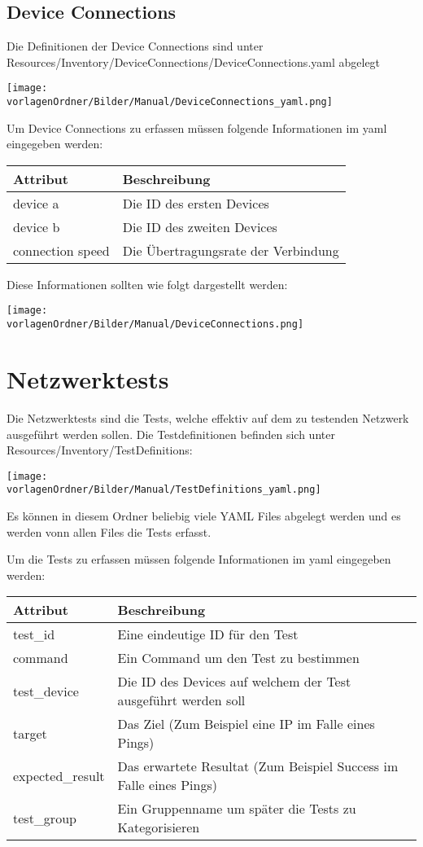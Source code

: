 \documentclass[
	ngerman,
	toc=listof, %
	toc=bibliography, %
	footnotes=multiple, %
	parskip=half, %
	numbers=noendperiod %
]{scrartcl}
\newcommand{\vorlagenOrdner}{../99_Vorlagen} %
\begin{document}
	\subsection{Device Connections}
		Die Definitionen der Device Connections sind unter \\
		Resources/Inventory/DeviceConnections/DeviceConnections.yaml abgelegt

		\texttt{[image: \\vorlagenOrdner/Bilder/Manual/DeviceConnections\_yaml.png]}

		Um Device Connections zu erfassen müssen folgende Informationen im yaml eingegeben werden:

		\begin{tabularx}{\textwidth}{ll}
			\toprule
			Attribut & Beschreibung \\
			\midrule
			device a & Die ID des ersten Devices \\
			device b & Die ID des zweiten Devices \\
			connection speed & Die Übertragungsrate der Verbindung\\
			\midrule
		\end{tabularx}

		Diese Informationen sollten wie folgt dargestellt werden: 

		\texttt{[image: \\vorlagenOrdner/Bilder/Manual/DeviceConnections.png]}

\section{Netzwerktests}
	Die Netzwerktests sind die Tests, welche effektiv auf dem zu testenden Netzwerk 
	ausgeführt werden sollen.
	Die Testdefinitionen befinden sich unter Resources/Inventory/TestDefinitions:

	\texttt{[image: \\vorlagenOrdner/Bilder/Manual/TestDefinitions\_yaml.png]}

	Es können in diesem Ordner beliebig viele YAML Files abgelegt werden und es werden vonn allen Files die Tests erfasst.

	Um die Tests zu erfassen müssen folgende Informationen im yaml eingegeben werden:

	\begin{tabularx}{\textwidth}{ll}
		\toprule
		Attribut & Beschreibung \\
		\midrule
		test\_id & Eine eindeutige ID für den Test \\
		command & Ein Command um den Test zu bestimmen \\
		test\_device & Die ID des Devices auf welchem der Test ausgeführt werden soll\\
		target & Das Ziel (Zum Beispiel eine IP im Falle eines Pings)\\
		expected\_result & Das erwartete Resultat (Zum Beispiel Success im Falle eines Pings)\\
		test\_group & Ein Gruppenname um später die Tests zu Kategorisieren\\
		\midrule
	\end{tabularx}
\end{document}
